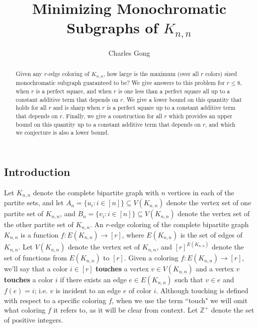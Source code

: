 \documentclass{article}
\title{\textbf{Minimizing Monochromatic Subgraphs of $K_{n,n}$}}
\author{Charles Gong}
\date{}
\begin{document}
\maketitle

\begin{abstract}
Given any $r$-edge coloring of $K_{n,n}$, how large is the maximum (over all $r$ colors) sized monochromatic subgraph guaranteed to be? We give answers to this problem for $r \leq 8$, when $r$ is a perfect square, and when $r$ is one less than a perfect square all up to a constant additive term that depends on $r$. We give a lower bound on this quantity that holds for all $r$ and is sharp when $r$ is a perfect square up to a constant additive term that depends on $r$. Finally, we give a construction for all $r$ which provides an upper bound on this quantity up to a constant additive term that depends on $r$, and which we conjecture is also a lower bound. 
\end{abstract}

\begin{center}
\section{Introduction}
\end{center}

Let $K_{n,n}$ denote the complete bipartite graph with $n$ vertices in each of the partite sets, and let $A_n = \{u_i : i \in [n]\} \subseteq V(K_{n,n})$ denote the vertex set of one partite set of $K_{n,n}$, and $B_n = \{v_i : i \in [n]\} \subseteq V(K_{n,n})$ denote the vertex set of the other partite set of $K_{n,n}$. An $r$-edge coloring of the complete bipartite graph $K_{n,n}$ is a function  $f : E(K_{n,n}) \rightarrow [r]$, where $E(K_{n,n})$ is the set of edges of $K_{n,n}$. Let $V(K_{n,n})$ denote the vertex set of $K_{n,n}$, and $[r]^{E(K_{n,n})}$ denote the set of functions from $E(K_{n,n})$ to $[r]$.  Given a coloring $f :  E(K_{n,n}) \rightarrow [r]$, we'll say that a color $i \in [r]$ \textbf{touches} a vertex $v \in V(K_{n,n})$ and a vertex $v$ \textbf{touches} a color $i$ if there exists an edge $e \in E(K_{n,n})$ such that $v \in e$ and $f(e) = i$; i.e. $v$ is incident to an edge $e$ of color $i$. Although touching is defined with respect to a specific coloring $f$, when we use the term ``touch" we will omit what coloring $f$ it refers to, as it will be clear from context. Let $\mathbb{Z}^{+}$ denote the set of positive integers. \\
\end{document}
